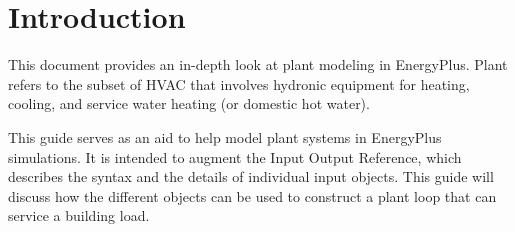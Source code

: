 \chapter{Introduction}\label{introduction}

This document provides an in-depth look at plant modeling in EnergyPlus. Plant refers to the subset of HVAC that involves hydronic equipment for heating, cooling, and service water heating (or domestic hot water).

This guide serves as an aid to help model plant systems in EnergyPlus simulations. It is intended to augment the Input Output Reference, which describes the syntax and the details of individual input objects. This guide will discuss how the different objects can be used to construct a plant loop that can service a building load.
